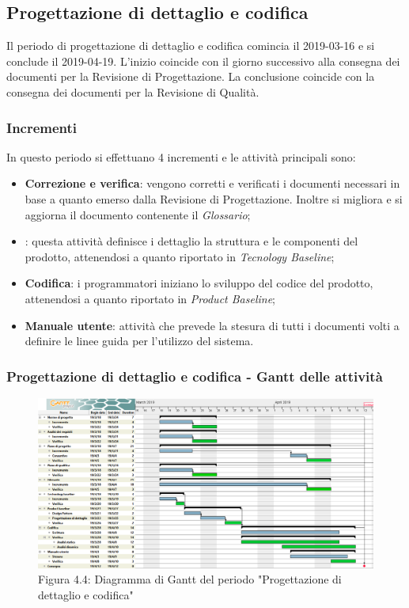 \subsection{Progettazione di dettaglio e codifica}
Il periodo di progettazione di dettaglio e codifica comincia il 2019-03-16 e si conclude il 2019-04-19. L'inizio coincide con il giorno successivo alla consegna dei documenti per la Revisione di Progettazione. La conclusione coincide con la consegna dei documenti per la Revisione di Qualità. 
\subsubsection{Incrementi}
In questo periodo si effettuano 4 incrementi e le attività principali sono:
\begin{itemize}
\item{\textbf{Correzione e verifica}: vengono corretti e verificati i documenti necessari in base a quanto emerso dalla Revisione di Progettazione. Inoltre si migliora e si aggiorna il documento contenente il \emph{Glossario};} 
\item{\textbf{}: questa attività definisce i dettaglio la struttura e le componenti del prodotto, attenendosi a quanto riportato in \emph{Tecnology Baseline};} 
\item{\textbf{Codifica}: i programmatori iniziano lo sviluppo del codice del prodotto, attenendosi a quanto riportato in \emph{Product Baseline};}	
\item{\textbf{Manuale utente}: attività che prevede la stesura di tutti i documenti volti a definire le linee guida per l'utilizzo del sistema.}
\end{itemize}

\subsubsection{Progettazione di dettaglio e codifica - Gantt delle attività}

\begin{figure} [H]
	\centering
	\includegraphics[scale=0.35]{Res/Gantt/Codifica}
	\caption{Figura 4.4: Diagramma di Gantt del periodo "Progettazione di dettaglio e codifica"}\label{}
\end{figure}

\pagebreak
